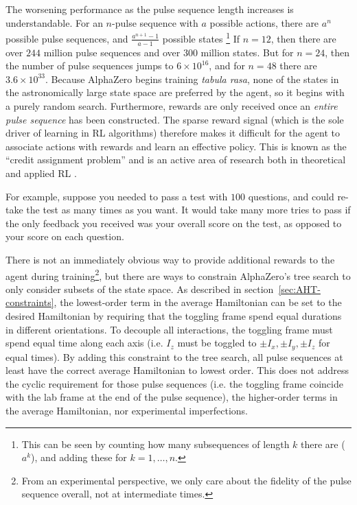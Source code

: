The worsening performance as the pulse sequence length increases is understandable. For an $n$-pulse sequence with $a$ possible actions, there are $a^n$ possible pulse sequences, and $\frac{a^{n+1} - 1}{a-1}$ possible states%
\footnote{
This can be seen by counting how many subsequences of length $k$ there are ($a^k$), and adding these for $k = 1, \dots, n$.
}
If $n=12$, then there are over $244$ million pulse sequences and over $300$ million states.
But for $n=24$, then the number of pulse sequences jumps to $6 \times 10^{16}$, and for $n=48$ there are $3.6 \times 10^{33}$. Because AlphaZero begins training \emph{tabula rasa}, none of the states in the astronomically large state space are preferred by the agent, so it begins with a purely random search.
Furthermore, rewards are only received once an \emph{entire pulse sequence} has been constructed. The sparse reward signal (which is the sole driver of learning in RL algorithms) therefore makes it difficult for the agent to associate actions with rewards and learn an effective policy.
This is known as the ``credit assignment problem'' and is an active area of research both in theoretical and applied RL \cite{arumugam2021informationtheoretic}.

For example, suppose you needed to pass a test with $100$ questions, and could re-take the test as many times as you want. It would take many more tries to pass if the only feedback you received was your overall score on the test, as opposed to your score on each question.

There is not an immediately obvious way to provide additional rewards to the agent during training\footnote{
From an experimental perspective, we only care about the fidelity of the pulse sequence overall, not at intermediate times.
},
but there are ways to constrain AlphaZero's tree search to only consider subsets of the state space.
As described in section~\ref{sec:AHT-constraints}, the lowest-order term in the average Hamiltonian can be set to the desired Hamiltonian by
requiring that the toggling frame spend equal durations in different orientations.
To decouple all interactions, the toggling frame must spend equal time along each axis (i.e. $I_z$ must be toggled to $\pm I_x, \pm I_y, \pm I_z$ for equal times).
By adding this constraint to the tree search, all pulse sequences at least have the correct average Hamiltonian to lowest order. This does not address the cyclic requirement for those pulse sequences (i.e. the toggling frame coincide with the lab frame at the end of the pulse sequence), the higher-order terms in the average Hamiltonian, nor experimental imperfections.

